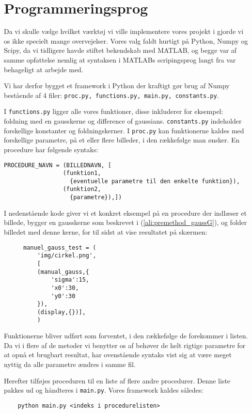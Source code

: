 \thispagestyle{plain}
\section{Programmeringsprog}
\pagestyle{headings}
Da vi skulle vælge hvilket værktøj vi ville implementere vores projekt i gjorde vi os ikke specielt mange overvejelser. 
Vores valg faldt hurtigt på Python, Numpy og Scipy, da vi tidligere havde stiftet bekendskab med MATLAB, og begge var af samme opfattelse nemlig
at syntaksen i MATLABs scripingsprog langt fra var behageligt at arbejde med.


Vi har derfor bygget et framework i Python der kraftigt gør brug af Numpy bestående af 4 filer: \texttt{proc.py, functions.py, main.py, constants.py}.

I \texttt{functions.py} ligger alle vores funktioner, disse inkluderer for eksempel: foldning med en gausskerne og difference of gaussians.
\texttt{constants.py} indeholder forskellige konstanter og foldningskerner. I \texttt{proc.py} kan funktionerne kaldes med forskellige parametre, på et eller flere billeder, i den rækkefølge man ønsker.
En procedure har følgende syntaks:
\begin{verbatim}
PROCEDURE_NAVN = (BILLEDNAVN, [
                 (funktion1,
                   {eventuelle parametre til den enkelte funktion}),
                 (funktion2,
                   {parametre}),])
\end{verbatim}
I nedenstående kode giver vi et konkret eksempel på en procedure der indlæser et billede, bygger en gausskerne som beskrevet i (\ref{ali:premethod_gaussG}), og folder billedet med denne kerne, for til sidst at vise resultatet på skærmen:
\begin{figure}[H]
\begin{verbatim}
manuel_gauss_test = ( 
    'img/cirkel.png',
    [
    (manual_gauss,{
        'sigma':15,
        'x0':30,
        'y0':30
    }),
    (display,{})],
    )
\end{verbatim}
\end{figure}
Funktionerne bliver udført som forventet, i den rækkefølge de forekommer i listen.
Da vi i flere af de metoder vi benytter os af behøver de helt rigtige parametre for at opnå et brugbart resultat, har ovenstående syntaks vist sig at være meget nyttig da alle parametre ændres i samme fil.

Herefter tilføjes proceduren til en liste af flere andre procedurer. Denne liste pakkes ud og håndteres i \texttt{main.py}. Vores framework kaldes således: 
\begin{verbatim}
	python main.py <indeks i procedurelisten>
\end{verbatim}


